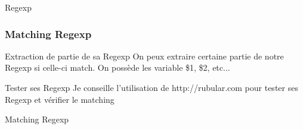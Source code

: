 \documentclass{beamer}
\begin{document}
\begin{frame}
  \begin{block}{Regexp}
    
  \end{block}
\end{frame}

\begin{frame}
  \frametitle{Matching Regexp}
  \begin{block}{Extraction de partie de sa Regexp}
    On peux extraire certaine partie de notre Regexp si celle-ci match. On possède les
    variable \$1, \$2, etc...
  \end{block}

  \begin{block}{Tester ses Regexp}
    Je conseille l'utilisation de http://rubular.com pour tester ses Regexp et
    v\'erifier le matching
  \end{block}
\end{frame}

\begin{frame}
  \begin{block}{Matching Regexp}
    
  \end{block}
\end{frame}
\end{document}
